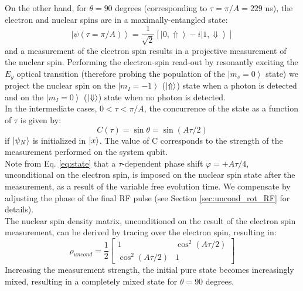 On the other hand, for $\theta = 90$ degrees (corresponding to $\tau = \pi/A = 229$ ns), the electron and nuclear spins are in a maximally-entangled state:
\begin{equation}
\left| \psi (\tau=\pi/A) \right \rangle = \frac{1}{\sqrt{2}} \left[ \left| 0, \Uparrow \right \rangle -i \left| 1, \Downarrow \right \rangle \right]
\end{equation}
and a measurement of the electron spin results in a projective measurement of the nuclear spin. Performing the electron-spin read-out by resonantly exciting the $E_y$ optical transition (therefore probing the population of the $\left| m_s=0 \right \rangle$ state) we project the nuclear spin on the $\left| m_I = -1 \right \rangle$ ($\left|\Uparrow\right>$) state when a photon is detected and on the $\left| m_I = 0 \right \rangle$ ($\left|\Downarrow\right>$) state when no photon is detected.\\
In the intermediate cases, $0<\tau<\pi/A$, the concurrence of the state as a function of $\tau$ is given by:
\begin{equation}
 C (\tau) = \sin\theta=\sin \left( A \tau/2 \right) 
\label{eq:concurrence}
\end{equation}
if $\left|\psi_N\right>$ is initialized in $\left|x\right>$. The value of C corresponds to the strength of the measurement performed on the system qubit.\\
Note from Eq. \ref{eq:state} that a $\tau$-dependent phase shift $\varphi = + A \tau/4$, unconditional on the electron spin, is imposed on the nuclear spin state after the measurement, as a result of the variable free evolution time. We compensate by adjusting the phase of the final RF pulse (see Section \ref{sec:uncond_rot_RF} for details).\\
The nuclear spin density matrix, unconditioned on the result of the electron spin measurement, can be derived by tracing over the electron spin, resulting in:
\begin{equation}
 \rho_{uncond} = \frac{1}{2}
 \left[
\begin{array}{cc}
1 & \cos^2 ( A \tau/2)\\
\cos^2 ( A \tau/2) & 1
 \end{array}
 \right]
\label{eq:uncondRho}
 \end{equation}
Increasing the measurement strength, the initial pure state becomes increasingly mixed, resulting in a completely mixed state for $\theta = 90$ degrees.\\

